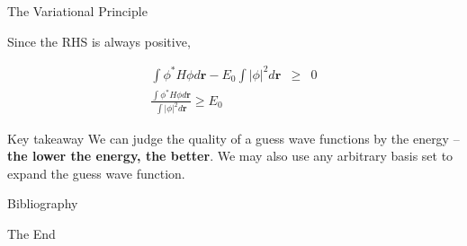 \documentclass[aspectratio=169]{beamer}
\let \vec \mathbf
\begin{document}
\begin{frame}{The Variational Principle}

Since the RHS is always positive,

    \begin{eqnarray*}
    \int \phi^* H \phi d\vec{r} - E_0 \int |\phi|^2 d\vec{r} & \geq & 0\\
    \frac{\int \phi^* H \phi d\vec{r}}{\int |\phi|^2 d\vec{r}} \geq E_0
    \end{eqnarray*}
\begin{alertblock}{Key takeaway}
We can judge the quality of a guess wave functions by the energy – \textbf{the lower the energy, the better}. We may also use any arbitrary basis set to expand the guess wave function.
\end{alertblock}
\end{frame}



\begin{frame}[allowframebreaks]{Bibliography}
    
    
\end{frame}



\begin{frame}
    \Huge{\centerline{The End}}
\end{frame}
\end{document}

